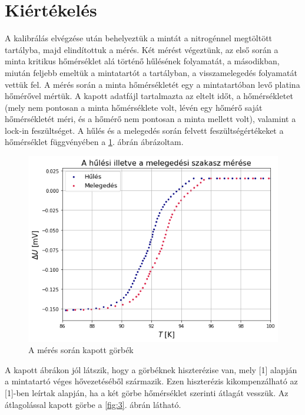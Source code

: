 \documentclass[12pt,a4paper]{article}
\begin{document}
\section{Kiértékelés}
\hspace*{10pt} A kalibrálás elvégzése után behelyeztük a mintát a nitrogénnel megtöltött tartályba, majd elindítottuk a mérés. Két mérést végeztünk, az első során a minta kritikus hőmérséklet alá történő hűlésének folyamatát, a másodikban, miután feljebb emeltük a mintatartót a tartályban, a visszamelegedés folyamatát vettük fel. A mérés során a minta hőmérsékletét egy a mintatartóban levő platina hőmérővel mértük. A kapott adatfájl tartalmazta az eltelt időt, a hőmérsékletet (mely nem pontosan a minta hőmérséklete volt, lévén egy hőmérő saját hőmérsékletét méri, és a hőmérő nem pontosan a minta mellett volt), valamint a lock-in feszültséget. A hűlés és a melegedés során felvett feszültségértékeket a hőmérséklet függvényében a \ref{fig:2}. ábrán ábrázoltam.
\newpage
\begin{figure}[!h]
\centering
\includegraphics[scale=0.65]{hul_mel}
\caption{A mérés során kapott görbék}
\label{fig:2}
\end{figure}
A kapott ábrákon jól látszik, hogy a görbéknek hiszterézise van, mely [1] alapján a mintatartó véges hővezetéséből származik. Ezen hiszterézis kikompenzálható az [1]-ben leírtak alapján, ha a két görbe hőmérséklet szerinti átlagát vesszük. Az átlagolással kapott görbe a \ref{fig:3}. ábrán látható.
\end{document}
